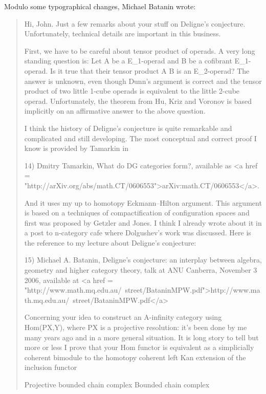 Modulo some typographical changes, Michael Batanin wrote:

\begin{quote}

   Hi, John.
   Just a few remarks about your stuff on Deligne's conjecture. 
   Unfortunately, technical details are important in this business.

   First, we have to be careful about tensor product of operads. A
   very long standing question is: Let A be a E_{1}-operad and
   B be a cofibrant E_{1}-operad.  Is it true that their
   tensor product A \otimes  B is an E_{2}-operad?  The answer
   is unknown, even though Dunn's argument is correct and the tensor
   product of two little 1-cube operads is equivalent to the little
   2-cube operad.  Unfortunately, the theorem from Hu, Kriz and
   Voronov is based implicitly on an affirmative answer to the above
   question.

   I think the history of Deligne's conjecture is quite remarkable and 
   complicated and still developing. The most conceptual and correct 
   proof I know is provided by Tamarkin in 

   14) Dmitry Tamarkin, What do DG categories form?, available as <a
   href =
   "http://arXiv.org/abs/math.CT/0606553">arXiv:math.CT/0606553</a>.

   And it uses my up to homotopy Eckmann--Hilton argument. This argument 
   is based on a techniques of compactification of configuration spaces 
   and first was proposed by Getzler and Jones.  I think I already wrote 
   about it in a post to n-category cafe where Dolgushev's work was 
   discussed. Here is the reference to my lecture about Deligne's conjecture:

   15) Michael A. Batanin, Deligne's conjecture: an interplay between
   algebra, geometry and higher category theory, talk at ANU Canberra,
   November 3 2006, available at 
   <a href = "http://www.math.mq.edu.au/~street/BataninMPW.pdf">http://www.math.mq.edu.au/~street/BataninMPW.pdf</a>
 
   Concerning your idea to construct an A-infinity category using 
   Hom(PX,Y), where PX is a projective resolution: it's been done by 
   me many years ago and in a more general situation.  It is long story 
   to tell but more or less I prove that your Hom functor is equivalent 
   as a simplicially coherent bimodule to the homotopy coherent left 
   Kan extension of the inclusion functor 

   Projective bounded chain complex \to  Bounded chain complex 


\end{quote}
